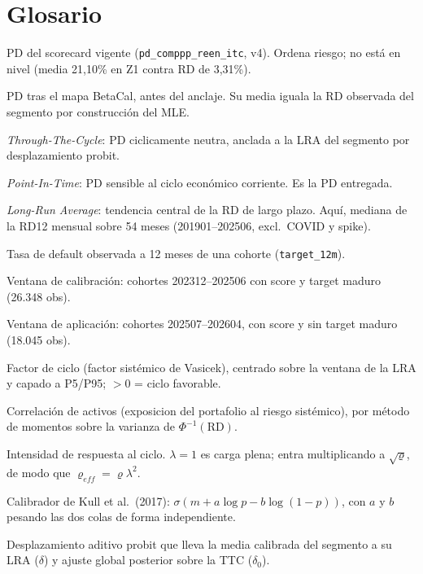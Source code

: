 \documentclass[12pt, a4paper]{article}
\newcommand{\RD}{\ensuremath{\mathrm{RD}}}
\renewcommand{\rho}{\ensuremath{\varrho}}
\newcommand{\ft}{\ensuremath{f_t}}
\newcommand{\Norm}{\ensuremath{\Phi}}
\begin{document}
\newpage
\section{Glosario}
\begin{description}[style=nextline, leftmargin=2.2cm]
  \item[PD\_raw] PD del scorecard vigente (\texttt{pd\_comppp\_reen\_itc}, v4). Ordena riesgo; no está en nivel (media 21,10\% en Z1 contra RD de 3,31\%).
  \item[PD\_cal] PD tras el mapa BetaCal, antes del anclaje. Su media iguala la RD observada del segmento por construcción del MLE.
  \item[TTC] \textit{Through-The-Cycle}: PD ciclicamente neutra, anclada a la LRA del segmento por desplazamiento probit.
  \item[PIT] \textit{Point-In-Time}: PD sensible al ciclo económico corriente. Es la PD entregada.
  \item[LRA] \textit{Long-Run Average}: tendencia central de la RD de largo plazo. Aquí, mediana de la RD12 mensual sobre 54 meses (201901--202506, excl.\ COVID y spike).
  \item[RD12] Tasa de default observada a 12 meses de una cohorte (\texttt{target\_12m}).
  \item[Z1] Ventana de calibración: cohortes 202312--202506 con score y target maduro (26.348 obs).
  \item[Z2] Ventana de aplicación: cohortes 202507--202604, con score y sin target maduro (18.045 obs).
  \item[$\ft$] Factor de ciclo (factor sistémico de Vasicek), centrado sobre la ventana de la LRA y capado a P5/P95; $>0$ = ciclo favorable.
  \item[$\rho$] Correlación de activos (exposicion del portafolio al riesgo sistémico), por método de momentos sobre la varianza de $\Norm^{-1}(\RD)$.
  \item[$\lambda$] Intensidad de respuesta al ciclo. $\lambda=1$ es carga plena; entra multiplicando a $\sqrt{\rho}$, de modo que $\rho_{eff}=\rho\lambda^2$.
  \item[BetaCal] Calibrador de Kull et al.\ (2017): $\sigma(m+a\log p-b\log(1-p))$, con $a$ y $b$ pesando las dos colas de forma independiente.
  \item[$\delta$ / $\delta_0$] Desplazamiento aditivo probit que lleva la media calibrada del segmento a su LRA ($\delta$) y ajuste global posterior sobre la TTC ($\delta_0$).

\end{description}
\end{document}
